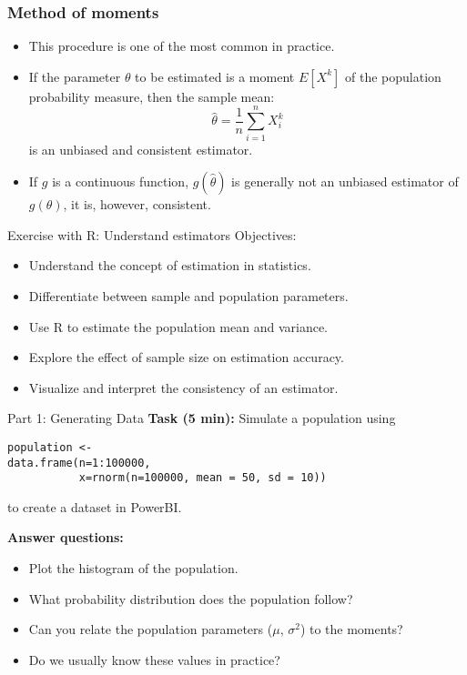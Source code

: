 \documentclass[main.tex]{subfiles}
\begin{document}
\begin{frame}
    \frametitle{Method of moments}
\begin{itemize}
    \item<+-> This procedure is one of the most common in practice.
    \item<+-> If the parameter $\theta$ to be estimated is a moment $E\left[ X^k \right]$ of the population probability measure, then
    the sample mean:
    \begin{equation}
        \hat{\theta} = \frac{1}{n} \sum_{i=1}^n X_i^k
    \end{equation}
    is an unbiased and consistent estimator.
    \item<+-> If $g$ is a continuous function, $g\left(\hat{\theta}\right)$ is generally not an unbiased estimator of $g\left( \theta \right)$, it is, 
    however, consistent.
\end{itemize}
\end{frame}

\begin{frame}
\begin{block}{Exercise with R: Understand estimators}
Objectives:
\begin{itemize}
  \item Understand the concept of estimation in statistics.
  \item Differentiate between sample and population parameters.
  \item Use R to estimate the population mean and variance.
  \item Explore the effect of sample size on estimation accuracy.
  \item Visualize and interpret the consistency of an estimator.
\end{itemize}
\end{block}
\end{frame}


\begin{frame}[fragile]
\begin{block}{Part 1: Generating Data}
\textbf{Task (5 min):} Simulate a population using
{\footnotesize
\begin{verbatim}
population <- 
data.frame(n=1:100000,
           x=rnorm(n=100000, mean = 50, sd = 10))
\end{verbatim}}
to create a dataset in PowerBI.

\textbf{Answer questions:}
\begin{itemize}
  \item<+-> Plot the histogram of the population.
  \item<+-> What probability distribution does the population follow? 
  \item<+-> Can you relate the population parameters ($\mu$, $\sigma^2$) to the moments?
  \item<+-> Do we usually know these values in practice?
\end{itemize}
\end{block}
\end{frame}
\end{document}
